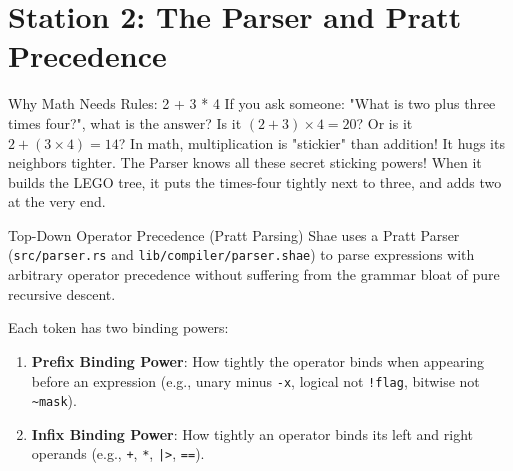 \section{Station 2: The Parser and Pratt Precedence}

\begin{kidbox}{Why Math Needs Rules: 2 + 3 * 4}
If you ask someone: "What is two plus three times four?", what is the answer?
Is it $(2 + 3) \times 4 = 20$? Or is it $2 + (3 \times 4) = 14$?
In math, multiplication is "stickier" than addition! It hugs its neighbors tighter.
The Parser knows all these secret sticking powers! When it builds the LEGO tree, it puts the times-four tightly next to three, and adds two at the very end.
\end{kidbox}

\begin{deepbox}{Top-Down Operator Precedence (Pratt Parsing)}
Shae uses a Pratt Parser (\texttt{src/parser.rs} and \texttt{lib/compiler/parser.shae}) to parse expressions with arbitrary operator precedence without suffering from the grammar bloat of pure recursive descent.

Each token has two binding powers:
\begin{enumerate}
    \item \textbf{Prefix Binding Power}: How tightly the operator binds when appearing before an expression (e.g., unary minus \texttt{-x}, logical not \texttt{!flag}, bitwise not \texttt{\~{}mask}).
    \item \textbf{Infix Binding Power}: How tightly an operator binds its left and right operands (e.g., \texttt{+}, \texttt{*}, \texttt{|>}, \texttt{==}).
\end{enumerate}


\end{deepbox}
